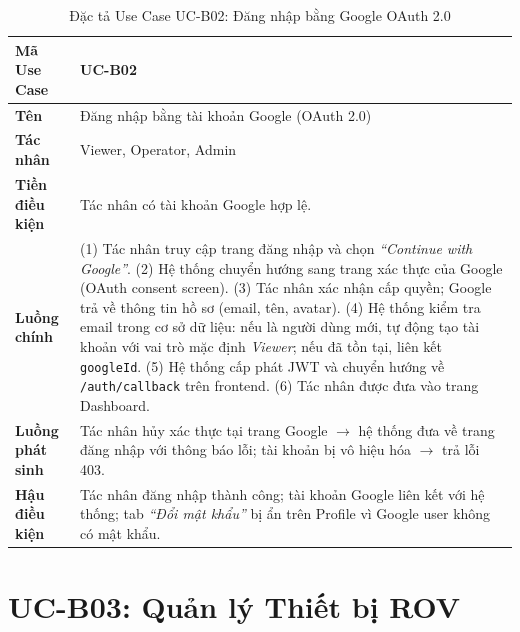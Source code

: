 \documentclass[../DoAn.tex]{subfiles}
\begin{document}
\begin{longtable}{|p{3.5cm}|p{10.0cm}|}
\caption{Đặc tả Use Case UC-B02: Đăng nhập bằng Google OAuth 2.0}\label{tab:ucb02}\\
\hline
\textbf{Mã Use Case} & UC-B02 \\
\hline
\textbf{Tên} & Đăng nhập bằng tài khoản Google (OAuth 2.0) \\
\hline
\textbf{Tác nhân} & Viewer, Operator, Admin \\
\hline
\textbf{Tiền điều kiện} & Tác nhân có tài khoản Google hợp lệ. \\
\hline
\textbf{Luồng chính} &
(1) Tác nhân truy cập trang đăng nhập và chọn \textit{``Continue with Google''}. \newline
(2) Hệ thống chuyển hướng sang trang xác thực của Google (OAuth consent screen). \newline
(3) Tác nhân xác nhận cấp quyền; Google trả về thông tin hồ sơ (email, tên, avatar). \newline
(4) Hệ thống kiểm tra email trong cơ sở dữ liệu: nếu là người dùng mới, tự động tạo tài khoản với vai trò mặc định \textit{Viewer}; nếu đã tồn tại, liên kết \texttt{googleId}. \newline
(5) Hệ thống cấp phát JWT và chuyển hướng về \texttt{/auth/callback} trên frontend. \newline
(6) Tác nhân được đưa vào trang Dashboard. \\
\hline
\textbf{Luồng phát sinh} & Tác nhân hủy xác thực tại trang Google $\to$ hệ thống đưa về trang đăng nhập với thông báo lỗi; tài khoản bị vô hiệu hóa $\to$ trả lỗi 403. \\
\hline
\textbf{Hậu điều kiện} & Tác nhân đăng nhập thành công; tài khoản Google liên kết với hệ thống; tab \textit{``Đổi mật khẩu''} bị ẩn trên Profile vì Google user không có mật khẩu. \\
\hline
\end{longtable}

\section{UC-B03: Quản lý Thiết bị ROV}
\end{document}
